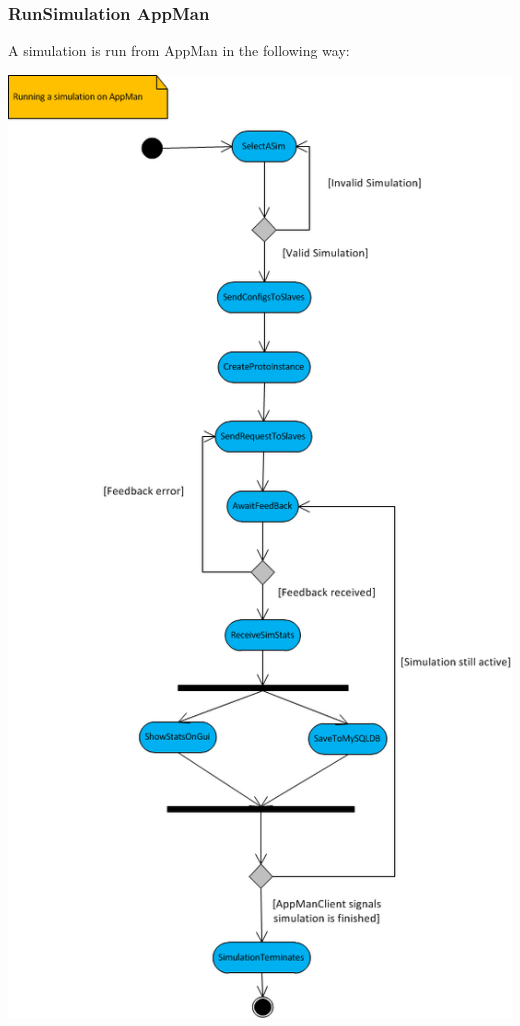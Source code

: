 \documentclass[a4paper,12pt,final]{article}
\begin{document}
\subsubsection{RunSimulation AppMan}
A simulation is run from AppMan in the following way:
\begin{center}
\includegraphics[scale=0.8]{RunningASimOnAppMan.png}
\end{center}
\end{document}
